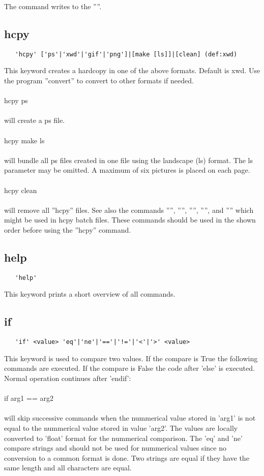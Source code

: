 \documentclass{article}
\begin{document}
The command writes to the ''''.

\subsection{\label{hcpy}hcpy}
\begin{verbatim}
   'hcpy' ['ps'|'xwd'|'gif'|'png']|[make [ls]]|[clean] (def:xwd)
\end{verbatim}
This keyword creates a hardcopy in one of the above formats. Default is xwd. Use the program ''convert'' to convert to other formats if needed.\\\\hcpy ps\\\\will create a ps file.\\\\hcpy make ls\\\\will bundle all ps files created in one file using the landscape (ls) format. The ls parameter may be omitted. A maximum of six pictures is placed on each page.\\\\hcpy clean\\\\will remove all ''hcpy'' files. See also the commands '''', '''', '''', '''', and '''' which might be used in hcpy batch files. These commands should be used in the shown order before using the ''hcpy'' command.

\subsection{\label{help}help}
\begin{verbatim}
   'help'
\end{verbatim}
This keyword prints a short overview of all commands.

\subsection{\label{if}if}
\begin{verbatim}
   'if' <value> 'eq'|'ne'|'=='|'!='|'<'|'>' <value>
\end{verbatim}
This keyword is used to compare two values. If the compare is True the following commands are executed. If the compare is False the code after 'else' is executed. Normal operation continues after 'endif':
\\\\if arg1 == arg2\\\\will skip successive commands when the nummerical value stored in 'arg1' is not equal to the nummerical value stored in value 'arg2'. The values are locally converted to 'float' format for the nummerical comparison. The 'eq' and 'ne' compare strings and should not be used for nummerical values since no conversion to a common format is done. Two strings are equal if they have the same length and all characters are equal.
\end{document}
